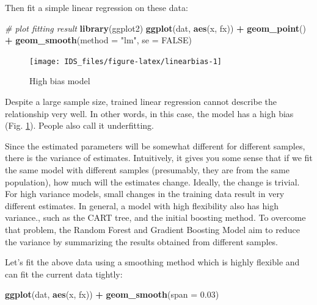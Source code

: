 \documentclass[12pt,]{krantz}
\makeatletter
\newenvironment{Shaded}{\begin{snugshade}}{\end{snugshade}}
\newcommand{\KeywordTok}[1]{\textcolor[rgb]{0.27,0.27,0.27}{\textbf{#1}}}
\newcommand{\DataTypeTok}[1]{\textcolor[rgb]{0.27,0.27,0.27}{#1}}
\newcommand{\FloatTok}[1]{\textcolor[rgb]{0.06,0.06,0.06}{#1}}
\newcommand{\StringTok}[1]{\textcolor[rgb]{0.5,0.5,0.5}{#1}}
\newcommand{\CommentTok}[1]{\textcolor[rgb]{0.37,0.37,0.37}{\textit{#1}}}
\newcommand{\OtherTok}[1]{\textcolor[rgb]{0.37,0.37,0.37}{#1}}
\newcommand{\OperatorTok}[1]{\textcolor[rgb]{0.43,0.43,0.43}{\textbf{#1}}}
\newcommand{\NormalTok}[1]{#1}
\newenvironment{kframe}{%
\medskip{}
\setlength{\fboxsep}{.8em}
 \def\at@end@of@kframe{}%
 \ifinner\ifhmode%
  \def\at@end@of@kframe{\end{minipage}}%
  \begin{minipage}{\columnwidth}%
 \fi\fi%
 \def\FrameCommand##1{\hskip\@totalleftmargin \hskip-\fboxsep
 \colorbox{shadecolor}{##1}\hskip-\fboxsep
     \hskip-\linewidth \hskip-\@totalleftmargin \hskip\columnwidth}%
 \MakeFramed {\advance\hsize-\width
   \@totalleftmargin\z@ \linewidth\hsize
   \@setminipage}}%
 {\par\unskip\endMakeFramed%
 \at@end@of@kframe}
\renewenvironment{Shaded}{\begin{kframe}}{\end{kframe}}
\theoremstyle{definition}
\theoremstyle{definition}
\theoremstyle{definition}
\theoremstyle{remark}
\makeatother
\begin{document}
Then fit a simple linear regression on these data:

\begin{Shaded}
\begin{Highlighting}[]
\CommentTok{# plot fitting result}
\KeywordTok{library}\NormalTok{(ggplot2)}
\KeywordTok{ggplot}\NormalTok{(dat, }\KeywordTok{aes}\NormalTok{(x, fx)) }\OperatorTok{+}\StringTok{ }\KeywordTok{geom_point}\NormalTok{() }\OperatorTok{+}\StringTok{ }\KeywordTok{geom_smooth}\NormalTok{(}\DataTypeTok{method =} \StringTok{"lm"}\NormalTok{, }\DataTypeTok{se =} \OtherTok{FALSE}\NormalTok{)}
\end{Highlighting}
\end{Shaded}

\begin{figure}

{\centering \texttt{[image: IDS\_files/figure-latex/linearbias-1]} 

}

\caption{High bias model}\label{fig:linearbias}
\end{figure}

Despite a large sample size, trained linear regression cannot describe
the relationship very well. In other words, in this case, the model has
a high bias (Fig. \ref{fig:linearbias}). People also call it
underfitting.

Since the estimated parameters will be somewhat different for different
samples, there is the variance of estimates. Intuitively, it gives you
some sense that if we fit the same model with different samples
(presumably, they are from the same population), how much will the
estimates change. Ideally, the change is trivial. For high variance
models, small changes in the training data result in very different
estimates. In general, a model with high flexibility also has high
variance., such as the CART tree, and the initial boosting method. To
overcome that problem, the Random Forest and Gradient Boosting Model aim
to reduce the variance by summarizing the results obtained from
different samples.

Let's fit the above data using a smoothing method which is highly
flexible and can fit the current data tightly:

\begin{Shaded}
\begin{Highlighting}[]
\KeywordTok{ggplot}\NormalTok{(dat, }\KeywordTok{aes}\NormalTok{(x, fx)) }\OperatorTok{+}\StringTok{ }\KeywordTok{geom_smooth}\NormalTok{(}\DataTypeTok{span =} \FloatTok{0.03}\NormalTok{)}
\end{Highlighting}
\end{Shaded}
\end{document}
